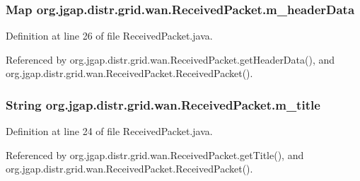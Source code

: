 \hypertarget{classorg_1_1jgap_1_1distr_1_1grid_1_1wan_1_1_received_packet_a5ac465938542016d1dbc87cb140e848d}{
\subsubsection[{m\-\_\-header\-Data}]{\setlength{\rightskip}{0pt plus 5cm}Map org.\-jgap.\-distr.\-grid.\-wan.\-Received\-Packet.\-m\-\_\-header\-Data\hspace{0.3cm}{\ttfamily [private]}}}\label{classorg_1_1jgap_1_1distr_1_1grid_1_1wan_1_1_received_packet_a5ac465938542016d1dbc87cb140e848d}


Definition at line 26 of file Received\-Packet.\-java.



Referenced by org.\-jgap.\-distr.\-grid.\-wan.\-Received\-Packet.\-get\-Header\-Data(), and org.\-jgap.\-distr.\-grid.\-wan.\-Received\-Packet.\-Received\-Packet().

\hypertarget{classorg_1_1jgap_1_1distr_1_1grid_1_1wan_1_1_received_packet_a421b11c0db76e89f3cc0cf0b2fc09518}{
\subsubsection[{m\-\_\-title}]{\setlength{\rightskip}{0pt plus 5cm}String org.\-jgap.\-distr.\-grid.\-wan.\-Received\-Packet.\-m\-\_\-title\hspace{0.3cm}{\ttfamily [private]}}}\label{classorg_1_1jgap_1_1distr_1_1grid_1_1wan_1_1_received_packet_a421b11c0db76e89f3cc0cf0b2fc09518}


Definition at line 24 of file Received\-Packet.\-java.



Referenced by org.\-jgap.\-distr.\-grid.\-wan.\-Received\-Packet.\-get\-Title(), and org.\-jgap.\-distr.\-grid.\-wan.\-Received\-Packet.\-Received\-Packet().

